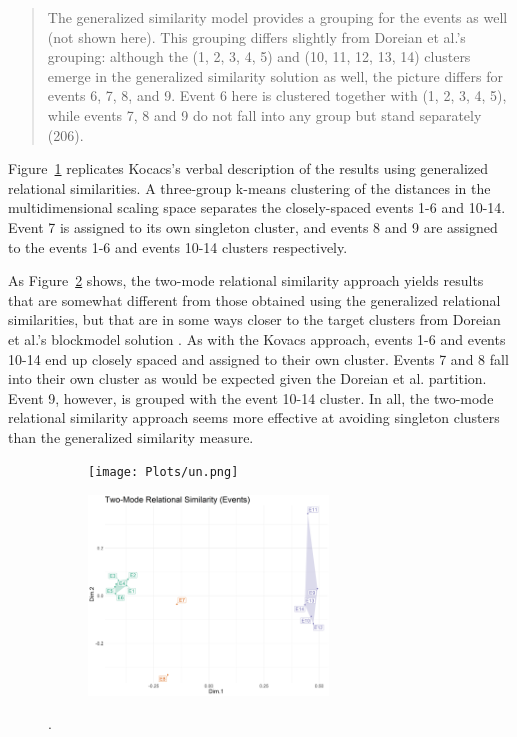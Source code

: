 \documentclass[a4paper,fleqn]{cas-sc}
\begin{document}
\begin{quote}
The generalized similarity model provides a grouping for the events as well (not shown here). This grouping differs slightly from Doreian et al.'s \citeyearpar{doreian2004} grouping: although the (1, 2, 3, 4, 5) and (10, 11, 12, 13, 14) clusters emerge in the generalized similarity solution as well, the picture differs for events 6, 7, 8, and 9. Event 6 here is clustered together with (1, 2, 3, 4, 5), while events 7, 8 and 9 do not fall into any group but stand separately  (206). 
\end{quote}

Figure~\ref{fig:grm-events} replicates Kocacs's verbal description of the results using generalized relational similarities. A three-group k-means clustering of the distances in the multidimensional scaling space separates the closely-spaced events 1-6 and 10-14. Event 7 is assigned to its own singleton cluster, and events 8 and 9 are assigned to the events 1-6 and events 10-14 clusters respectively. 

As Figure~\ref{fig:tmrs-events} shows, the two-mode relational similarity approach yields results that are somewhat different from those obtained using the generalized relational similarities, but that are in some ways closer to the target clusters from Doreian et al.'s blockmodel solution \citeyearpar{doreian2004}. As with the Kovacs approach, events 1-6 and events 10-14 end up closely spaced and assigned to their own cluster. Events 7 and 8 fall into their own cluster as would be expected given the Doreian et al. partition. Event 9, however, is grouped with the event 10-14 cluster. In all, the two-mode relational similarity approach seems more effective at avoiding singleton clusters than the generalized similarity measure. 

  \begin{figure}[ht!]
     \begin{subfigure}[b]{1.0\textwidth}
        \centering
        \texttt{[image: Plots/un.png]}
        \caption{}
        \label{fig:grm-events}
    \end{subfigure} 
     \begin{subfigure}[b]{1.0\textwidth}
        \centering
        \includegraphics[width=0.7\textwidth]{Plots/tmrs-events.png}
        \caption{}
        \label{fig:tmrs-events}
    \end{subfigure} 
    \caption{.}
    \label{fig:events}
 \end{figure}
\end{document}

